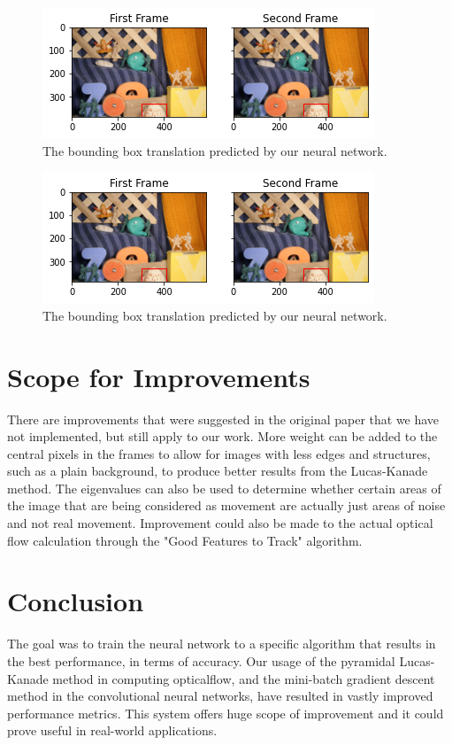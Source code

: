 \documentclass[]{article}
\begin{document}
\begin{figure}[H]
    \centering
    \includegraphics[width=\textwidth]{index.png}
    \caption{The bounding box translation predicted by our neural network.}
    \label{fig:optical_flow_neural_net}
\end{figure}

\begin{figure}[H]
    \centering
    \includegraphics[width=\textwidth]{index2.png}
    \caption{The bounding box translation predicted by our neural network.}
    \label{fig:optical_flow_neural_net}
\end{figure}

\section{Scope for Improvements}\label{sec:improvements}
There are improvements that were suggested in the original paper that we have not implemented, but still apply to our work.
More weight can be added to the central pixels in the frames to allow for images with less edges and structures, such as a plain background, to produce better results from the Lucas-Kanade method.
The eigenvalues can also be used to determine whether certain areas of the image that are being considered as movement are actually just areas of noise and not real movement.
Improvement could also be made to the actual optical flow calculation through the "Good Features to Track" algorithm.\cite{features}

\section{Conclusion}\label{sec:conclusion}
The goal was to train the neural network to a specific algorithm that results in the best performance, in terms of accuracy.
Our usage of the pyramidal Lucas-Kanade method in computing opticalflow, and the mini-batch gradient descent method in the convolutional neural networks, have resulted in vastly improved performance metrics.
This system offers huge scope of improvement and it could prove useful in real-world applications.

\listoffigures

\printbibliography
\end{document}
